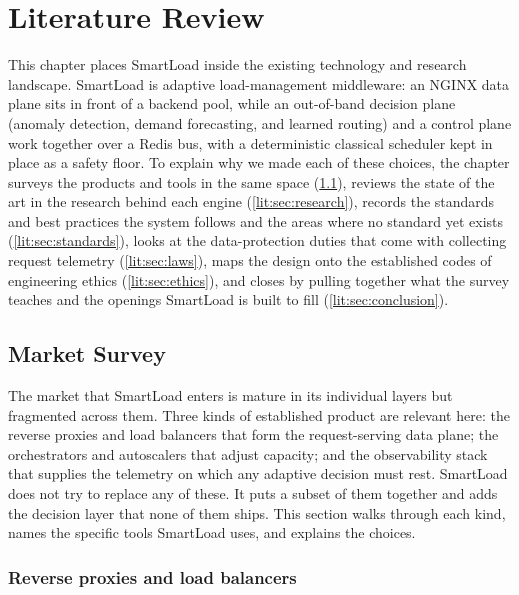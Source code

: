 \chapter{Literature Review}
\label{ch:litreview}
\label{lit:chapter}

This chapter places SmartLoad inside the existing technology and research
landscape. SmartLoad is adaptive load-management middleware: an NGINX data
plane sits in front of a backend pool, while an out-of-band decision plane
(anomaly detection, demand forecasting, and learned routing) and a control
plane work together over a Redis bus, with a deterministic classical scheduler
kept in place as a safety floor. To explain why we made each of these choices,
the chapter surveys the products and tools in the same space
(\cref{lit:sec:market}), reviews the state of the art in the research behind
each engine (\cref{lit:sec:research}), records the standards and best practices
the system follows and the areas where no standard yet exists
(\cref{lit:sec:standards}), looks at the data-protection duties that come with
collecting request telemetry (\cref{lit:sec:laws}), maps the design onto the
established codes of engineering ethics (\cref{lit:sec:ethics}), and closes by
pulling together what the survey teaches and the openings SmartLoad is built to
fill (\cref{lit:sec:conclusion}).

\section{Market Survey}
\label{lit:sec:market}

The market that SmartLoad enters is mature in its individual layers but
fragmented across them. Three kinds of established product are relevant here:
the reverse proxies and load balancers that form the request-serving data
plane; the orchestrators and autoscalers that adjust capacity; and the
observability stack that supplies the telemetry on which any adaptive decision
must rest. SmartLoad does not try to replace any of these. It puts a subset of
them together and adds the decision layer that none of them ships. This section
walks through each kind, names the specific tools SmartLoad uses, and explains
the choices.

\subsection{Reverse proxies and load balancers}
\label{lit:sec:market-lb}

